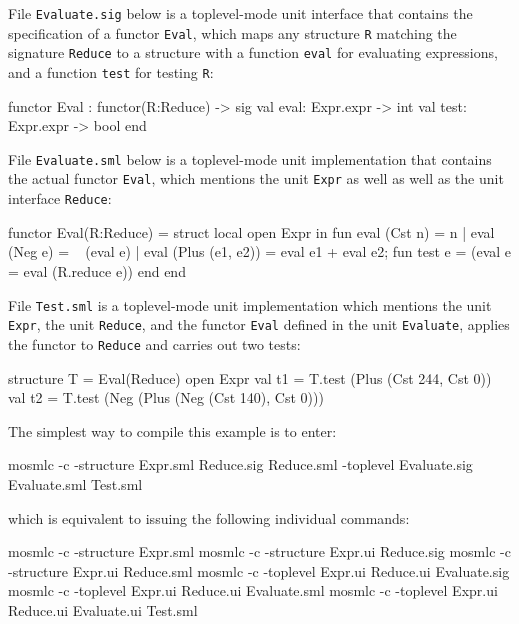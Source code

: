 \documentclass[fleqn,a4paper]{article}
\begin{document}
\noindent 
File {\tt Evaluate.sig} below is a toplevel-mode unit interface that
contains the specification of a functor {\tt Eval}, which maps any
structure {\tt R} matching the signature {\tt Reduce} to a structure
with a function {\tt eval} for evaluating expressions, and a function
{\tt test} for testing {\tt R}:

\begin{program}
functor Eval : functor(R:Reduce) ->
                 sig val eval: Expr.expr -> int 
                     val test: Expr.expr -> bool
                 end
\end{program}

\noindent
File {\tt Evaluate.sml} below is a toplevel-mode unit implementation
that contains the actual functor {\tt Eval}, which mentions the unit
{\tt Expr} as well as well as the unit interface {\tt Reduce}:

\begin{program}
functor Eval(R:Reduce) =
struct
  local open Expr in
  fun eval (Cst n)         = n
    | eval (Neg e)         = ~ (eval e)
    | eval (Plus (e1, e2)) = eval e1 + eval e2;
  fun test e = (eval e = eval (R.reduce e)) 
  end
end
\end{program}

\noindent 
File {\tt Test.sml} is a toplevel-mode unit implementation which
mentions the unit {\tt Expr}, the unit {\tt Reduce}, and the functor
{\tt Eval} defined in the unit {\tt Evaluate}, applies the functor to
{\tt Reduce} and carries out two tests:

\begin{program}
structure T = Eval(Reduce)
open Expr 
val t1 = T.test (Plus (Cst 244, Cst 0))
val t2 = T.test (Neg (Plus (Neg (Cst 140), Cst 0)))
\end{program}

\noindent The simplest way to compile this example is to enter:

\begin{program}
mosmlc -c -structure Expr.sml Reduce.sig Reduce.sml -toplevel Evaluate.sig Evaluate.sml Test.sml
\end{program}

\noindent
which is equivalent to issuing the following individual commands:
\begin{program}
mosmlc -c -structure Expr.sml 
mosmlc -c -structure Expr.ui Reduce.sig 
mosmlc -c -structure Expr.ui Reduce.sml 
mosmlc -c -toplevel Expr.ui Reduce.ui Evaluate.sig 
mosmlc -c -toplevel Expr.ui Reduce.ui Evaluate.sml 
mosmlc -c -toplevel Expr.ui Reduce.ui Evaluate.ui Test.sml 
\end{program}
\end{document}
